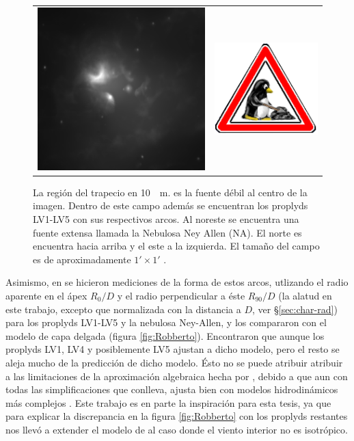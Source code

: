\begin{figure}
  \begin{tabular}{lr}    \includegraphics[width=0.5\linewidth]{./Figures/Orion_Robberto}&\includegraphics[width=0.1\linewidth]{./Figures/tux-development}
  \end{tabular}
  \caption{La región del trapecio en \SI{10}{\mu m}. \thC{} es la fuente débil al centro de la imagen. Dentro de este campo además se encuentran los proplyds LV1-LV5 con sus respectivos arcos. Al noreste se encuentra una fuente extensa llamada la Nebulosa Ney Allen (NA). El norte es encuentra hacia arriba y el este a la izquierda. El tamaño del campo es de aproximadamente $1' \times 1'$ \citep{Robberto:2005}.}
\end{figure}

Asimismo, en \citet{Robberto:2005} se hicieron mediciones de la forma de estos arcos, utlizando el radio aparente en el ápex $R_0/D$ y el radio perpendicular a éste $R_{90}/D$ (la alatud en este trabajo, excepto que normalizada con la distancia a \thC{} $D$, ver \S \ref{sec:char-rad}) para los proplyds LV1-LV5 y la nebulosa Ney-Allen, y los compararon con el modelo de capa delgada \citep{Canto:1996} (figura \ref{fig:Robberto}). Encontraron que aunque los proplyds LV1, LV4 y posiblemente LV5 ajustan a dicho modelo, pero el resto se aleja mucho de la predicción de dicho modelo. Ésto no se puede atribuir atribuir a las limitaciones de la aproximación algebraica hecha por \citet{Canto:1996}, debido a que aun con todas las simplificaciones que conlleva, ajusta bien con modelos hidrodinámicos más complejos \citep{Garcia-Arredondo:2001}. Este trabajo es en parte la inspiración para esta tesis, ya que para explicar la discrepancia en la figura \ref{fig:Robberto} con los proplyds restantes nos llevó a extender el modelo de \citet{Canto:1996} al caso donde el viento interior no es isotrópico.

